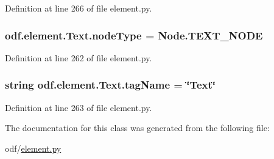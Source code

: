 Definition at line 266 of file element.\+py.

\hypertarget{classodf_1_1element_1_1Text_ac1eb83101645ca0be4db49cf7bd20df3}{
\subsubsection[{node\+Type}]{\setlength{\rightskip}{0pt plus 5cm}odf.\+element.\+Text.\+node\+Type = Node.\+T\+E\+X\+T\+\_\+\+N\+O\+D\+E\hspace{0.3cm}{\ttfamily [static]}}}\label{classodf_1_1element_1_1Text_ac1eb83101645ca0be4db49cf7bd20df3}


Definition at line 262 of file element.\+py.

\hypertarget{classodf_1_1element_1_1Text_a4c8fd912194c2e0e9774c6df1d974e97}{
\subsubsection[{tag\+Name}]{\setlength{\rightskip}{0pt plus 5cm}string odf.\+element.\+Text.\+tag\+Name = \char`\"{}Text\char`\"{}\hspace{0.3cm}{\ttfamily [static]}}}\label{classodf_1_1element_1_1Text_a4c8fd912194c2e0e9774c6df1d974e97}


Definition at line 263 of file element.\+py.



The documentation for this class was generated from the following file\+:\begin{DoxyCompactItemize}
\item 
odf/\hyperlink{element_8py}{element.\+py}\end{DoxyCompactItemize}
